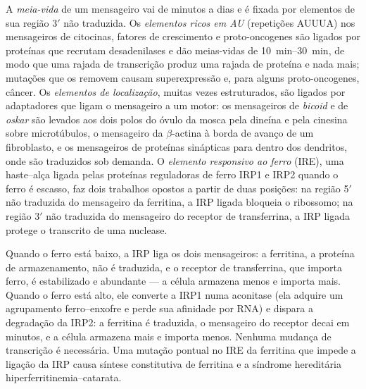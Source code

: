 \begin{definition}\label{def:b3:rna-regulation:stability}
A \emph{meia-vida} de um mensageiro vai de minutos a dias e é fixada
por elementos de sua região 3$'$ não traduzida. Os \emph{elementos
ricos em AU} (repetições AUUUA) nos mensageiros de citocinas, fatores
de crescimento e proto-oncogenes são ligados por proteínas que
recrutam desadenilases e dão meias-vidas de \qtyrange{10}{30}{min}, de
modo que uma rajada de transcrição produz uma rajada de proteína e
nada mais; mutações que os removem causam superexpressão e, para
alguns proto-oncogenes, câncer. Os \emph{elementos de localização},
muitas vezes estruturados, são ligados por adaptadores que ligam o
mensageiro a um motor: os mensageiros de \emph{bicoid} e de
\emph{oskar} são levados aos dois polos do óvulo da mosca pela dineína
e pela cinesina sobre microtúbulos, o mensageiro da $\beta$-actina
à borda de avanço de um fibroblasto, e os mensageiros de proteínas
sinápticas para dentro dos dendritos, onde são traduzidos sob demanda.
O \emph{elemento responsivo ao ferro} (IRE), uma haste--alça ligada
pelas proteínas reguladoras de ferro IRP1 e IRP2 quando o ferro é
escasso, faz dois trabalhos opostos a partir de duas posições: na
região 5$'$ não traduzida do mensageiro da ferritina, a IRP ligada
bloqueia o ribossomo; na região 3$'$ não traduzida do mensageiro do
receptor de transferrina, a IRP ligada protege o transcrito de uma
nuclease.
\end{definition}

\begin{example}\label{ex:b3:rna-regulation:iron}
Quando o ferro está baixo, a IRP liga os dois mensageiros: a ferritina,
a proteína de armazenamento, não é traduzida, e o receptor de
transferrina, que importa ferro, é estabilizado e abundante --- a
célula armazena menos e importa mais. Quando o ferro está alto, ele
converte a IRP1 numa aconitase (ela adquire um agrupamento
ferro--enxofre e perde sua afinidade por RNA) e dispara a degradação da
IRP2: a ferritina é traduzida, o mensageiro do receptor decai em
minutos, e a célula armazena mais e importa menos. Nenhuma mudança de
transcrição é necessária. Uma mutação pontual no IRE da ferritina que
impede a ligação da IRP causa síntese constitutiva de ferritina e a
síndrome hereditária hiperferritinemia--catarata.
\end{example}

